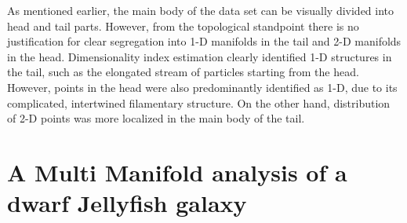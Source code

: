 As mentioned earlier, the main body of the data set can be visually divided into head and tail parts.
However, from the topological standpoint there is no justification for clear segregation into 1-D manifolds in the tail and 2-D manifolds in the head.
Dimensionality index estimation clearly identified 1-D structures in the tail, such as the elongated stream of particles starting from the head.
However, points in the head were also predominantly identified as 1-D, due to its complicated, intertwined filamentary structure.
On the other hand, distribution of 2-D points was more localized in the main body of the tail.


\section{A Multi Manifold analysis of a dwarf Jellyfish galaxy}\label{sec:manifold_jellyfish}

